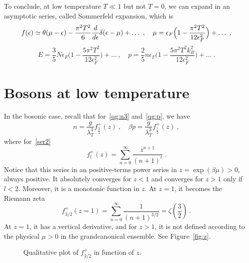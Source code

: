     To conclude, at low temperature $T \ll 1$ but not $T=0$, we can expand in an asymptotic series, called Sommerfeld expansion, which is 
    \begin{equation*}
        f(\epsilon) \simeq \theta (\mu - \epsilon) - \frac{\pi^2 T^2}{6} \frac{d}{d\epsilon} \delta (\epsilon - \mu) + \ldots ~, \quad \mu = \epsilon_F \Big (1 - \frac{\pi^2 T^2}{12 \epsilon_F^2} \Big ) + \ldots ~,
    \end{equation*}
    \begin{equation*}
        E = \frac{3}{5} N \epsilon_F \Big (1 - \frac{5 \pi^2 T^2}{12 \epsilon_F^2} \Big ) + \ldots ~, \quad p = \frac{2}{5} n \epsilon_F \Big (1 - \frac{5 \pi^2 T^2 k_B^2}{12 \epsilon_F^2} \Big ) + \ldots ~.
    \end{equation*}

\section{Bosons at low temperature}

    In the bosonic case, recall that for~\eqref{qg:n3} and~\eqref{qg:p}, we have
    \begin{equation*}
        n = \frac{g}{\lambda_T^3} f_{\frac{3}{2}}^+ (z) ~, \quad \beta p = \frac{g}{\lambda_T^3} f_{\frac{5}{2}}^+ (z) ~,
    \end{equation*}
    where for~\eqref{ser2}
    \begin{equation*}
        f_l^+ (z) = \sum_{n=0}^\infty \frac{z^{n+1}}{(n+1)^l} ~.
    \end{equation*}
    Notice that this series in an positive-terms power series in $z = \exp(\beta\mu) > 0$, always positive. It absolutely converges for $z < 1$ and converges for $z > 1$ only if $l < 2$. Moreover, it is a monotonic function in $z$. At $z = 1$, it becomes the Riemann zeta 
    \begin{equation*}
        f^+_{3/2} (z=1) = \sum_{n=0}^\infty \frac{1}{(n+1)^{3/2}} = \zeta(\frac{3}{2}) ~.
    \end{equation*}
    At $z = 1$, it has a vertical derivative, and for $z > 1$, it is not defined according to the physical $\mu > 0$ in the grandcanonical ensemble. See Figure~\eqref{fig:z}.
    \begin{figure}[h!]
        \centering
        \caption{Qualitative plot of $f^+_{3/2}$ in function of $z$.}
        \label{fig:z}
    \end{figure}

